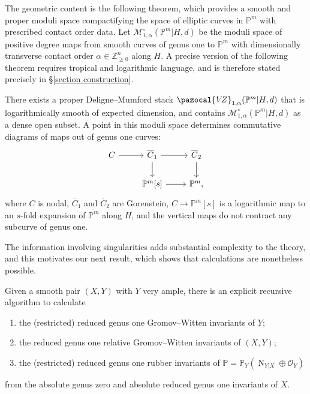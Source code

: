 \documentclass[11pt]{amsart}
\newcommand{\PP}{\mathbb P}
\newcommand{\VZ}{\pazocal{V\!Z}}
\newcommand{\OO}{\mathcal{O}}
\renewcommand{\to}{\rightarrow}
\theoremstyle{definition}
\newenvironment{customthm}[1]
  {\renewcommand\theinnercustomthm{#1}\innercustomthm}
  {\endinnercustomthm}
\theoremstyle{definition}
\begin{document}
The geometric content is the following theorem, which provides a smooth and proper moduli space compactifying the space of elliptic curves in $\mathbb P^m$ with prescribed contact order data. Let $\mathcal M_{1,\alpha}^\circ(\mathbb P^m|H,d)$ be the moduli space of positive degree maps from smooth curves of genus one to $\mathbb P^m$ with dimensionally transverse contact order $\alpha\in\mathbb Z^n_{\geq 0}$ along $H$. A precise version of the following theorem requires tropical and logarithmic language, and is therefore stated precisely in \S \ref{section construction}.

\begin{customthm}{A}\label{thm: desingularization}
There exists a proper Deligne--Mumford stack $\VZ_{1,\alpha}(\mathbb P^m|H,d)$ that is logarithmically smooth of expected dimension, and contains $\mathcal M_{1,\alpha}^\circ(\mathbb P^m|H,d)$  as a dense open subset. A point in this moduli space determines commutative diagrams of maps out of genus one curves:
\[
\begin{tikzcd}
C\arrow{r} & \overline C_1\arrow{d}\arrow{r} & \overline C_2\arrow{d} \\ 
& \mathbb P^m[s]\arrow{r} & \mathbb P^m,
\end{tikzcd}
\]
where $C$ is nodal, $\overline C_1$ and $\overline C_2$ are Gorenstein, $C\to \PP^m[s]$ is a logarithmic map to an $s$-fold expansion of $\PP^m$ along $H$, and the vertical maps do not contract any subcurve of genus one.
\end{customthm}



The information involving singularities adds substantial complexity to the theory, and this motivates our next result, which shows that calculations are nonetheless possible. 

\begin{customthm}{B}\label{thm: recursion}
Given a smooth pair $(X,Y)$ with $Y$ very ample, there is an explicit recursive algorithm to calculate
\begin{enumerate}
\item the (restricted) reduced genus one Gromov--Witten invariants of $Y$;
\item the reduced genus one relative Gromov--Witten invariants of $(X,Y)$; 
\item the (restricted) reduced genus one rubber invariants of $\mathbb{P}=\PP_Y(\operatorname{N}_{Y|X} \oplus \OO_Y)$
\end{enumerate}
from the absolute genus zero and absolute reduced genus one invariants of $X$.
\end{customthm}
\end{document}

